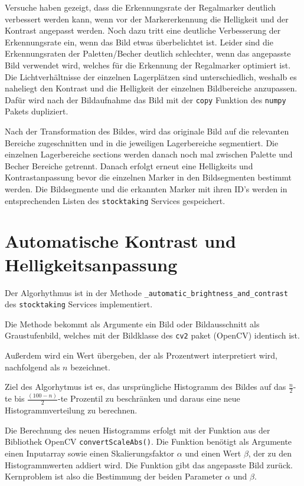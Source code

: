     Versuche haben gezeigt, dass die Erkennungsrate der Regalmarker deutlich verbessert werden kann, wenn vor der Markererkennung die Helligkeit und der Kontrast angepasst werden. 
    Noch dazu tritt eine deutliche Verbesserung der Erkennungsrate ein, wenn das Bild etwas überbelichtet ist. 
    Leider sind die Erkennungsraten der Paletten/Becher deutlich schlechter, wenn das angepasste Bild verwendet wird, welches für die Erkennung der Regalmarker optimiert ist. 
    Die Lichtverhältnisse der einzelnen Lagerplätzen sind unterschiedlich, weshalb es naheliegt den Kontrast und die Helligkeit der einzelnen Bildbereiche anzupassen. 
    Dafür wird nach der Bildaufnahme das Bild mit der \verb|copy| Funktion des \verb|numpy| Pakets dupliziert.

    Nach der Transformation des Bildes, wird das originale Bild auf die relevanten Bereiche zugeschnitten und in die jeweiligen Lagerbereiche segmentiert.
    Die einzelnen Lagerbereiche \glqq sections \grqq werden danach noch mal zwischen Palette und Becher Bereiche getrennt. 
    Danach erfolgt erneut eine Helligkeits und Kontrastanpassung bevor die einzelnen Marker in den Bildsegmenten bestimmt werden. 
    Die Bildsegmente und die erkannten Marker mit ihren ID's werden in entsprechenden Listen des \verb|stocktaking| Services gespeichert.

    \section {Automatische Kontrast und Helligkeitsanpassung}
    Der Algorhythmus ist in der Methode \verb|_automatic_brightness_and_contrast| des \verb|stocktaking| Services implementiert. 

    Die Methode bekommt als Argumente ein Bild oder Bildausschnitt als Graustufenbild, welches mit der Bildklasse des \verb|cv2| paket (OpenCV) identisch ist. 

    Außerdem wird ein Wert übergeben, der als Prozentwert interpretiert wird, nachfolgend als $n$ bezeichnet.
    
    Ziel des Algorhytmus ist es, das ursprüngliche Histogramm des Bildes auf das $\frac{n}{2}$-te bis $\frac{(100-n)}{2}$-te Prozentil zu beschränken und
    daraus eine neue Histogrammverteilung zu berechnen. 

    Die Berechnung des neuen Histogramms erfolgt mit der Funktion aus der Bibliothek OpenCV \verb|convertScaleAbs()|. 
    Die Funktion benötigt als Argumente einen Inputarray sowie einen Skalierungsfaktor $\alpha$ und einen Wert $\beta$, der zu den Histogrammwerten addiert wird.
    Die Funktion gibt das angepasste Bild zurück.
    Kernproblem ist also die Bestimmung der beiden Parameter $\alpha$ und $\beta$. 

